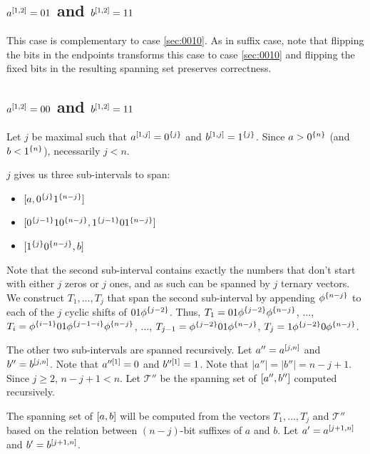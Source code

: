 \subsection{\texorpdfstring
{$a^{[1, 2]} = 01$ and $b^{[1, 2]} = 11$}
{a[1,2] = 01 and b[1,2] = 11}
}

This case is complementary to case \ref{sec:0010}.
As in suffix case,
note that flipping the bits in the endpoints
transforms this case to case \ref{sec:0010}
and flipping the fixed bits in the resulting spanning set
preserves correctness.

\subsection{\texorpdfstring
{$a^{[1, 2]} = 00$ and $b^{[1, 2]} = 11$}
{a[1,2] = 00 and b[1,2] = 11}
}

Let $j$ be maximal such that
$a^{[1, j]} = 0^{\{j\}}$ and
$b^{[1, j]} = 1^{\{j\}}$.
Since $a > 0^{\{n\}}$ (and $b < 1^{\{n\}}$),
necessarily $j < n$.

$j$ gives us three sub-intervals to span:

\begin{itemize}
\item $[a, 0^{\{j\}} 1^{\{n-j\}}]$
\item $[0^{\{j-1\}} 1 0^{\{n-j\}}, 1^{\{j-1\}} 0 1^{\{n-j\}}]$
\item $[1^{\{j\}} 0^{\{n-j\}}, b]$
\end{itemize}

Note that the second sub-interval contains exactly
the numbers that don't start with either $j$ zeros
or $j$ ones,
and as such can be spanned by $j$ ternary vectors.
We construct $T_1, \ldots, T_j$ that span
the second sub-interval
by appending $\phi^{\{n-j\}}$
to each of the $j$ cyclic shifts of $01 \phi^{\{j-2\}}$.
Thus,
$T_1 = 01 \phi^{\{j-2\}} \phi^{\{n-j\}}$,
$\ldots$,
$T_i = \phi^{\{i-1\}} 01 \phi^{\{j-1-i\}} \phi^{\{n-j\}}$,
$\ldots$,
$T_{j-1} = \phi^{\{j-2\}} 01 \phi^{\{n-j\}}$,
$T_j = 1 \phi^{\{j-2\}} 0 \phi^{\{n-j\}}$.

The other two sub-intervals are spanned recursively.
Let $a'' = a^{[j, n]}$ and $b'' = b^{[j, n]}$.
Note that $a''^{[1]} = 0$ and $b''^{[1]} = 1$.
Note that $|a''| = |b''| = n - j + 1$.
Since $j \geq 2$, $n-j+1 < n$.
Let $\mathcal{T}''$ be the spanning set
of $[a'', b'']$ computed recursively.

The spanning set of $[a, b]$ will be computed
from the vectors $T_1, \ldots, T_j$ and $\mathcal{T}''$
based on the relation between $(n-j)$-bit suffixes of $a$
and $b$.
Let $a' = a^{[j+1, n]}$ and $b' = b^{[j+1, n]}$.

